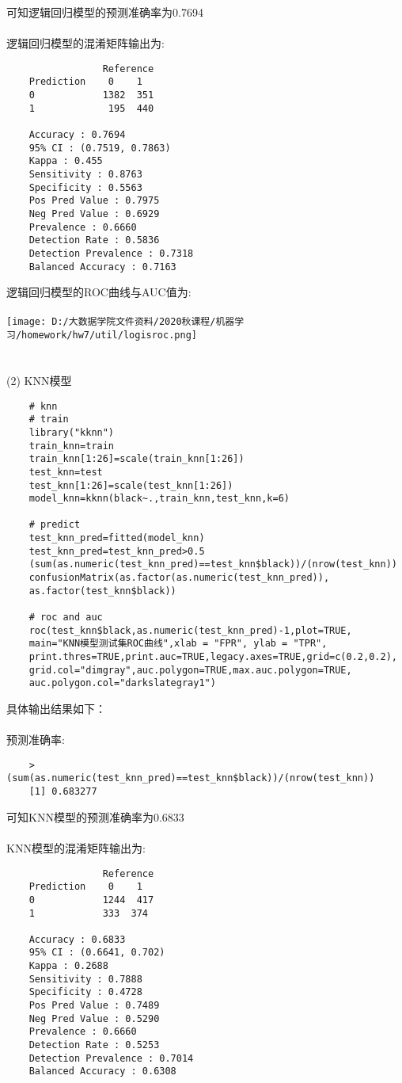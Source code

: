 \documentclass[]{article}
\begin{document}
可知逻辑回归模型的预测准确率为0.7694\\\\
逻辑回归模型的混淆矩阵输出为:
\begin{lstlisting}
	             Reference
	Prediction    0    1
	0            1382  351
	1             195  440
	
	Accuracy : 0.7694          
	95% CI : (0.7519, 0.7863)
	Kappa : 0.455           
	Sensitivity : 0.8763          
	Specificity : 0.5563          
	Pos Pred Value : 0.7975          
	Neg Pred Value : 0.6929          
	Prevalence : 0.6660          
	Detection Rate : 0.5836          
	Detection Prevalence : 0.7318          
	Balanced Accuracy : 0.7163          
\end{lstlisting}
逻辑回归模型的ROC曲线与AUC值为:\\\\
\texttt{[image: D:/大数据学院文件资料/2020秋课程/机器学习/homework/hw7/util/logisroc.png]}\\\\\\
(2) KNN模型
\begin{lstlisting}
	# knn
	# train
	library("kknn")
	train_knn=train
	train_knn[1:26]=scale(train_knn[1:26])
	test_knn=test
	test_knn[1:26]=scale(test_knn[1:26])
	model_knn=kknn(black~.,train_knn,test_knn,k=6)
	
	# predict
	test_knn_pred=fitted(model_knn)
	test_knn_pred=test_knn_pred>0.5
	(sum(as.numeric(test_knn_pred)==test_knn$black))/(nrow(test_knn))
	confusionMatrix(as.factor(as.numeric(test_knn_pred)), 
	as.factor(test_knn$black))
	
	# roc and auc
	roc(test_knn$black,as.numeric(test_knn_pred)-1,plot=TRUE,
	main="KNN模型测试集ROC曲线",xlab = "FPR", ylab = "TPR",
	print.thres=TRUE,print.auc=TRUE,legacy.axes=TRUE,grid=c(0.2,0.2),
	grid.col="dimgray",auc.polygon=TRUE,max.auc.polygon=TRUE,
	auc.polygon.col="darkslategray1")
\end{lstlisting} 
具体输出结果如下：\\\\
预测准确率:
\begin{lstlisting}
	> (sum(as.numeric(test_knn_pred)==test_knn$black))/(nrow(test_knn))
	[1] 0.683277
\end{lstlisting}
可知KNN模型的预测准确率为0.6833\\\\
KNN模型的混淆矩阵输出为:
\begin{lstlisting}
	             Reference
	Prediction    0    1
	0            1244  417
	1            333  374
	
	Accuracy : 0.6833         
	95% CI : (0.6641, 0.702)
	Kappa : 0.2688         
	Sensitivity : 0.7888         
	Specificity : 0.4728         
	Pos Pred Value : 0.7489         
	Neg Pred Value : 0.5290         
	Prevalence : 0.6660         
	Detection Rate : 0.5253         
	Detection Prevalence : 0.7014         
	Balanced Accuracy : 0.6308              
\end{lstlisting}
\end{document}
